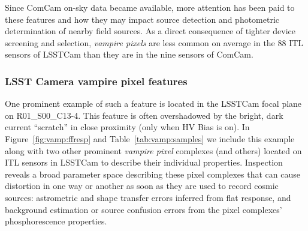 Since ComCam on-sky data became available, more attention has been paid to these features and how they may impact source detection and photometric determination of nearby field sources. As a direct consequence of tighter device screening and selection, {\it vampire pixels} are less common on average in the 88 ITL sensors of LSSTCam than they are in the nine sensors of ComCam. 


\subsubsection{LSST Camera vampire pixel features}\label{lsstcam-vampire-pixel-features}

One prominent example of such a feature is located in the LSSTCam focal plane on R01\_S00\_C13-4. This feature is often overshadowed by the bright, dark current ``scratch'' in close proximity (only when HV Bias is on). In Figure~\ref{fig:vamp:ffresp} and Table~\ref{tab:vamp:samples} we include this example along with two other prominent {\it vampire pixel} complexes (and others) located on ITL sensors in LSSTCam to describe their individual properties. Inspection reveals a broad parameter space describing these pixel complexes that can cause distortion in one way or another as soon as they are used to record cosmic sources: astrometric and shape transfer errors inferred from flat response, and background estimation or source confusion errors from the pixel complexes' phosphorescence properties.





